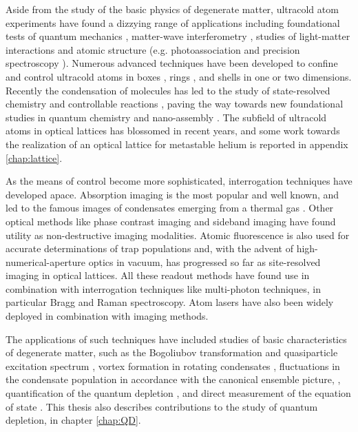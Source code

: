 	Aside from the study of the basic physics of degenerate matter, ultracold atom experiments have found a dizzying range of applications including foundational tests of quantum mechanics \cite{Lopes15,Manning15},	matter-wave interferometry \cite{Cronin09},	studies of light-matter interactions and atomic structure (e.g. photoassociation\cite{Jones06} and precision spectroscopy \cite{Campbell17,Marti18}). Numerous advanced techniques have been developed to confine and control ultracold atoms in boxes \cite{Meyrath05}, rings \cite{Gupta05}, and shells \cite{Gaunt13} in one \cite{Kinoshita04} or two \cite{Rychatrik04} dimensions. 
	Recently the condensation of molecules \cite{Zwirlein03} has led to the study of state-resolved chemistry and controllable reactions \cite{Balakrishnan16}, paving the way towards new foundational studies in quantum chemistry and nano-assembly \cite{Reynolds20}. 
	The subfield of ultracold atoms in optical lattices \cite{LewensteinLattices,Bloch05,Bloch08,Bloch12,Gross17} has blossomed in recent years, and some work towards the realization of an optical lattice for metastable helium is reported in appendix \ref{chap:lattice}.
	
	As the means of control become more sophisticated, interrogation techniques have developed apace. Absorption imaging is the most popular and well known, and led to the famous images of condensates emerging from a thermal gas \cite{Nobel01Note}. Other optical methods like phase contrast imaging \cite{MakingProbingUnderstanding} and sideband imaging \cite{Lye99} have found utility as non-destructive imaging modalities. Atomic fluorescence is also used for accurate determinations of trap populations \cite{VassenReview} and, with the advent of high-numerical-aperture optics in vacuum, has progressed so far as site-resolved imaging in optical lattices. 
	All these readout methods have found use in combination with interrogation techniques like multi-photon techniques, in particular Bragg  \cite{Stenger99} and Raman \cite{Hagley99,Cola04} spectroscopy. Atom lasers \cite{Mewes97,Bloch99} have also been widely deployed in combination with imaging methods.
	
	The applications of such techniques have included studies of basic characteristics of degenerate matter, such as the Bogoliubov transformation and quasiparticle excitation spectrum  \cite{Steinhauer02,Vogels02}, vortex formation in rotating condensates \cite{Madison00}, fluctuations in the condensate population in accordance with the canonical ensemble picture, \cite{Kristensen19}, quantification of the quantum depletion \cite{Xu06,Lopes17_depletion}, and direct measurement of the equation of state \cite{Mordini20}. 
	This thesis also describes contributions to the study of quantum depletion, in chapter \ref{chap:QD}.

